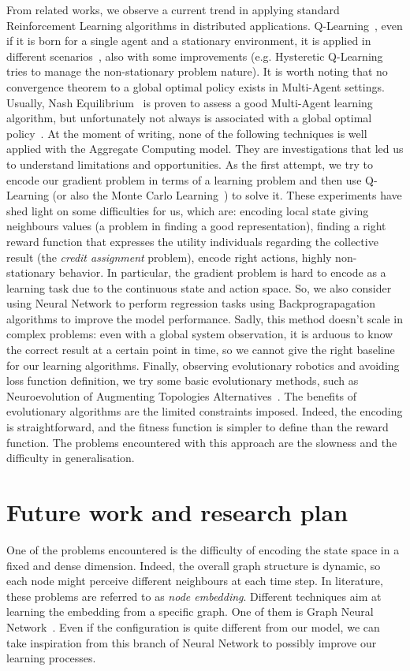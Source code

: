 \documentclass[conference]{IEEEtran}
\begin{document}
From related works, we observe a current trend in applying standard Reinforcement Learning algorithms in distributed applications.
Q-Learning~\cite{DBLP:journals/ras/Krose95}, even if it is born for a single agent and a stationary environment, it is applied in different scenarios~\cite{DBLP:conf/mass/ShahK07}, also with some improvements (e.g. Hysteretic Q-Learning~\cite{DBLP:conf/iros/MatignonLF07} tries to manage the non-stationary problem nature).
It is worth noting that no convergence theorem to a global optimal policy exists in Multi-Agent settings. 
Usually, Nash Equilibrium~\cite{DBLP:conf/icml/HuW98} is proven to assess a good Multi-Agent learning algorithm, but unfortunately not always is associated with a global optimal policy~\cite{DBLP:conf/uai/PeshkinKMK00}.
%
At the moment of writing, none of the following techniques is well applied with the Aggregate Computing model. They are investigations that led us to understand limitations and opportunities.
%
As the first attempt, we try to encode our gradient problem in terms of a learning problem and then use Q-Learning (or also the Monte Carlo Learning~\cite{DBLP:conf/nips/Thrun99}) to solve it.
These experiments have shed light on some difficulties for us, which are: encoding local state giving neighbours values (a problem in finding a good representation), finding a right reward function that expresses the utility individuals
regarding the collective result (the \emph{credit assignment} problem), encode right actions, highly non-stationary behavior. 
%
In particular, the gradient problem is hard to encode as a learning task due to the continuous state and action space.
So, we also consider using Neural Network to perform regression tasks using Backprograpagation algorithms to
improve the model performance. 
Sadly, this method doesn't scale in complex problems: even with a global system observation, it is arduous to know the correct result at a certain point in time, so 
we cannot give the right baseline for our learning algorithms.
%
Finally, observing evolutionary robotics and avoiding loss function definition, we try some basic evolutionary methods, such as Neuroevolution of Augmenting Topologies Alternatives~\cite{DBLP:journals/ec/StanleyM02}.
The benefits of evolutionary algorithms are the limited constraints imposed. Indeed, the encoding is straightforward, and the fitness function is simpler to define than the reward function.
The problems encountered with this approach are the slowness and the difficulty in generalisation.
%
\section{Future work and research plan}
One of the problems encountered is the difficulty of encoding the state space in a fixed and dense dimension. Indeed, the overall graph structure is dynamic, so each node might perceive different neighbours at each time step.
In literature, these problems are referred to as \emph{node embedding}. Different techniques aim at learning the embedding from a specific graph. One of them is Graph Neural Network~\cite{DBLP:journals/tnn/ScarselliGTHM09}.
Even if the configuration is quite different from our model, we can take inspiration from this branch of Neural Network to possibly improve our learning processes.
\end{document}

